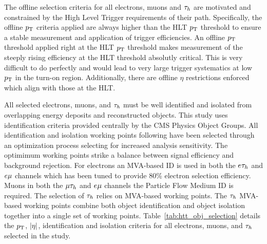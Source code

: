 The offline selection criteria for all electrons, muons and $\tau_{h}$ are motivated and constrained
by the High Level Trigger requirements of their path.  Specifically, the offline $p_\mathrm{T}$ criteria
applied are always higher than the HLT $p_\mathrm{T}$ threshold to ensure a stable measurement and application
of trigger efficiencies.  An offline $p_\mathrm{T}$ threshold applied right at the HLT $p_\mathrm{T}$ threshold
makes measurement of the steeply rising efficiency at the HLT threshold absolutly critical.
This is very difficult to do perfectly and would lead to very large trigger systematics
at low $p_\mathrm{T}$ in the turn-on region.  Additionally, there are offline $\eta$ restrictions
enforced which align with those at the HLT.

All selected electrons, muons, and $\tau_{h}$ must be well identified and isolated from overlapping
energy deposits and reconstructed objects.  This study uses identification criteria
provided centrally by the CMS Physics Object Groups.  All identification and isolation
working points following have been selected through an optimization process selecting
for increased analysis sensitivity.  The optimimum working points strike a balance
between signal efficiency and background rejection.  For electrons an MVA-based ID
is used in both the $e\tau_{h}$ and $e\mu$ channels which has been tuned to provide 
80\% electron selection efficiency.  Muons in both the $\mu\tau_{h}$ and $e\mu$ channels
the Particle Flow Medium ID is required.  The selection of $\tau_{h}$ relies on MVA-based working
points.  The $\tau_{h}$ MVA-based working points combine both object identification and object
isolation together into a single set of working points.  Table~\ref{tab:htt_obj_selection}
details the $p_\mathrm{T}$, $\lvert\eta\rvert$, identification and isolation criteria for all electrons, muons,
and $\tau_{h}$ selected in the study.



